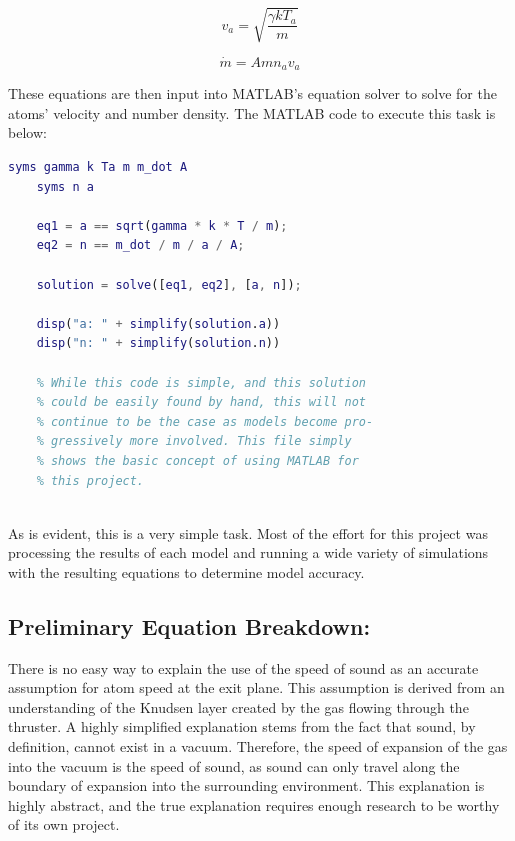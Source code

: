 \documentclass[letterpaper, 10 pt, conference]{ieeeconf}  %
\begin{document}
\begin{equation} \label{eq:1}
v_a = \sqrt{\frac{\gamma{}kT_a}{m}}
\end{equation}

\begin{equation} \label{eq:2}
\dot{m} = Amn_av_a
\end{equation}

These equations are then input into MATLAB’s equation solver to solve for the atoms’ velocity and number density. The MATLAB code to execute this task is below:

\BlankLine
\begin{lstlisting}[language=Matlab]
    syms gamma k Ta m m_dot A
    syms n a
    
    eq1 = a == sqrt(gamma * k * T / m);
    eq2 = n == m_dot / m / a / A;
    
    solution = solve([eq1, eq2], [a, n]);
    
    disp("a: " + simplify(solution.a))
    disp("n: " + simplify(solution.n))
    
    % While this code is simple, and this solution
    % could be easily found by hand, this will not
    % continue to be the case as models become pro-
    % gressively more involved. This file simply
    % shows the basic concept of using MATLAB for
    % this project.
    
\end{lstlisting}
\BlankLine

As is evident, this is a very simple task. Most of the effort for this project was processing the results of each model and running a wide variety of simulations with the resulting equations to determine model accuracy.

\subsection{Preliminary Equation Breakdown:}
There is no easy way to explain the use of the speed of sound as an accurate assumption for atom speed at the exit plane. This assumption is derived from an understanding of the Knudsen layer created by the gas flowing through the thruster. A highly simplified explanation stems from the fact that sound, by definition, cannot exist in a vacuum. Therefore, the speed of expansion of the gas into the vacuum is the speed of sound, as sound can only travel along the boundary of expansion into the surrounding environment. This explanation is highly abstract, and the true explanation requires enough research to be worthy of its own project.
\end{document}
